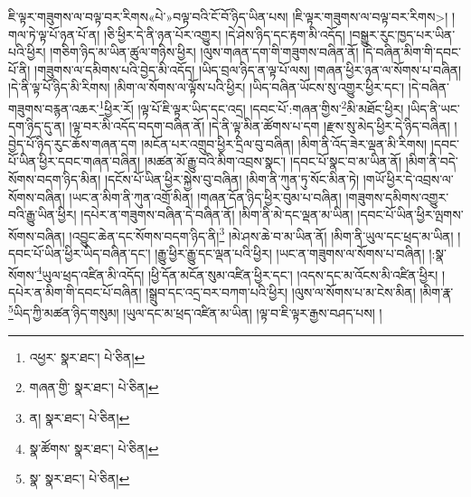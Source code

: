 ཇི་ལྟར་གཟུགས་ལ་བལྟ་བར་རིགས«པེ་»བལྟ་བའི་ངོ་བོ་ཉིད་ཡིན་པས། །ཇི་ལྟར་གཟུགས་ལ་བལྟ་བར་རིགས>། །གལ་ཏེ་ལྟ་པོ་ཉན་པོ་ན། །ཅི་ཕྱིར་དེ་ནི་ཉན་པོར་འགྱུར། །དེ་ཤེས་ཉིད་དང་རྟག་མི་འདོད། །བསྒྱུར་རུང་ཁྱད་པར་ཡིན་པའི་ཕྱིར། །གཅིག་ཉིད་མ་ཡིན་ཚུལ་གཉིས་ཕྱིར། །ལུས་གཞན་དག་གི་གཟུགས་བཞིན་ནོ། །དེ་བཞིན་མིག་གི་དབང་པོ་ནི། །གཟུགས་ལ་དམིགས་པའི་བྱེད་མི་འདོད། །ཡིད་བྲལ་ཉིད་ན་ལྟ་པོ་ལས། །གཞན་ཕྱིར་ཉན་ལ་སོགས་པ་བཞིན། །དེ་ནི་ལྟ་པོ་ཉིད་མི་རིགས། །མིག་ལ་སོགས་ལ་ལྟོས་པའི་ཕྱིར། །ཡིད་བཞིན་ཡོངས་སུ་འགྱུར་ཕྱིར་དང་། །དེ་བཞིན་གཟུགས་བརྙན་འཆར་\footnote{འཕྱར་  སྣར་ཐང་།  པེ་ཅིན། }ཕྱིར་རོ། །ལྟ་པོ་ཇི་ལྟར་ཡིད་དང་འདྲ། །དབང་པོ་:གཞན་གྱིས་\footnote{གཞན་གྱི་  སྣར་ཐང་།  པེ་ཅིན། }མི་མཐོང་ཕྱིར། །ཡིད་ནི་ཡང་དག་ཉིད་དུ་ན། །ལྟ་བར་མི་འདོད་བདག་བཞིན་ནོ། །དེ་ནི་ལྟ་མིན་ཚོགས་པ་དག །རྫས་སུ་མེད་ཕྱིར་དེ་ཉིད་བཞིན། །བྱེད་པོ་ཉིད་རུང་ཆོས་གཞན་དག །མངོན་པར་འགྲུབ་ཕྱིར་དྲིལ་བུ་བཞིན། །མིག་ནི་འོད་ཟེར་ལྡན་མི་རིགས། །དབང་པོ་ཡིན་ཕྱིར་དབང་གཞན་བཞིན། །མཚན་མོ་རྒྱུ་བའི་མིག་འབྲས་སྣང་། །དབང་པོ་སྣང་བ་མ་ཡིན་ནོ། །མིག་ནི་བདེ་སོགས་བདག་ཉིད་མིན། །དངོས་པོ་ཡིན་ཕྱིར་སྐྱེས་བུ་བཞིན། །མིག་ནི་ཀུན་ཏུ་སོང་མིན་ཏེ། །གཡོ་ཕྱིར་དེ་འབྲས་ལ་སོགས་བཞིན། །ཡང་ན་མིག་ནི་ཀུན་འགྲོ་མིན། །གཞན་དོན་ཉིད་ཕྱིར་བུམ་པ་བཞིན། །གཟུགས་དམིགས་འགྱུར་བའི་རྒྱུ་ཡིན་ཕྱིར། །དཔེར་ན་གཟུགས་བཞིན་དེ་བཞིན་ནོ། །མིག་ནི་མེ་དང་ལྡན་མ་ཡིན། །དབང་པོ་ཡིན་ཕྱིར་ལྤགས་སོགས་བཞིན། །འབྱུང་ཆེན་དང་སོགས་བདག་ཉིད་ནི།\footnote{ན།  སྣར་ཐང་།  པེ་ཅིན། } །མེ་ཤས་ཆེ་བ་མ་ཡིན་ནོ། །མིག་ནི་ཡུལ་དང་ཕྲད་མ་ཡིན། །དབང་པོ་ཡིན་ཕྱིར་ཡིད་བཞིན་དང་། །རྒྱུ་ཕྱིར་རྒྱུ་དང་ལྡན་པའི་ཕྱིར། །ཡང་ན་གཟུགས་ལ་སོགས་པ་བཞིན། །:སྣ་སོགས་\footnote{སྣ་ཚོགས་  སྣར་ཐང་།  པེ་ཅིན། }ཡུལ་ཕྲད་འཛིན་མི་འདོད། །ཕྱི་དོན་མངོན་སུམ་འཛིན་ཕྱིར་དང་། །འདས་དང་མ་འོངས་མི་འཛིན་ཕྱིར། །དཔེར་ན་མིག་གི་དབང་པོ་བཞིན། །སྒྲུབ་དང་འདྲ་བར་བཀག་པའི་ཕྱིར། །ལུས་ལ་སོགས་པ་མ་ངེས་མིན། །མིག་རྣ་\footnote{སྣ་  སྣར་ཐང་།  པེ་ཅིན། }ཡིད་ཀྱི་མཚན་ཉིད་གསུམ། །ཡུལ་དང་མ་ཕྲད་འཛིན་མ་ཡིན། །ལྟ་བ་ཇི་ལྟར་རྒྱས་བཤད་པས། །
